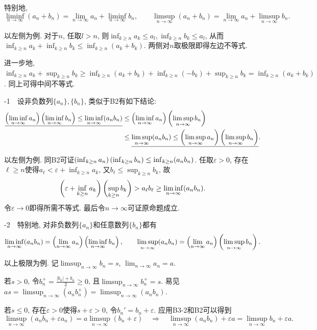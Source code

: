 特别地, $$\liminf_{n\to \infty} (a_n+b_n)  = \lim_{n\to \infty} a_n + \liminf_{n\to \infty} b_n , \qquad \limsup_{n\to \infty} (a_n+b_n)  = \lim_{n\to \infty} a_n + \limsup_{n\to \infty} b_n. $$

\begin{exsolution}
	以左侧为例. 对于$n$, 任取$l >n$, 则$\inf_{k \geq n}a_k \leq a_l, \inf_{k \geq n}b_k \leq a_l$, 从而$\inf_{k \geq n}a_k + \inf_{k \geq n}b_k \leq \inf_{k \geq n}(a_k+b_k)$. 两侧对$n$取极限即得左边不等式. 
	
	进一步地, $\inf_{k \geq n}a_k + \sup_{k \geq n}b_k \geq \inf_{k \geq n}(a_k+b_k) + \inf_{k \geq n}(-b_k) + \sup_{k \geq n}b_k = \inf_{k \geq n}(a_k+b_k)$. 同上可得中间不等式. 
\end{exsolution}

-1~~设非负数列$\{ a_n \}, \{ b_n \}$, 类似于B2有如下结论: 
\begin{align*}
	\underline{\left( \liminf_{n\to \infty} a_n \right)\left(  \liminf_{n\to \infty} b_n \right) \leq \liminf_{n\to \infty} (a_nb_n) } &\leq \left( \liminf_{n\to \infty} a_n \right)\left(  \limsup_{n\to \infty} b_n \right) \\
	&\leq \underline{\limsup_{n\to \infty} (a_nb_n) \leq \left( \limsup_{n\to \infty} a_n \right)\left(  \limsup_{n\to \infty} b_n \right)}.
\end{align*}

\begin{exsolution}
	以左侧为例. 同B2可证$\left( \inf_{k\geq n}a_n \right) \left( \inf_{k\geq n}b_n \right) \leq \inf_{k\geq n}(a_nb_n)$. 任取$\varepsilon >0$, 存在$\ell \geq n$使得$a_{\ell} < \varepsilon + \inf_{k\geq n} a_k$, 又$b_{\ell} \leq \sup_{k\geq n}b_k$, 故$$\left( \varepsilon + \inf_{k\geq n} a_k \right) \left( \sup_{k\geq n}b_k \right) >a_{\ell}b_{\ell} \geq \liminf_{n\to \infty} (a_nb_n). $$
	令$\varepsilon \to 0$即得所需不等式. 最后令$n\to \infty$可证原命题成立. 
\end{exsolution}

-2~~特别地, 对非负数列$\{ a_n \}$和任意数列$\{ b_n \}$都有$$\liminf_{n\to \infty} (a_nb_n) = \left( \lim_{n\to \infty} a_n \right) \left( \liminf_{n\to \infty} b_n \right), \qquad \limsup_{n\to \infty} (a_nb_n) = \left( \lim_{n\to \infty} a_n \right) \left( \limsup_{n\to \infty} b_n \right).$$

\begin{exsolution}
	以上极限为例. 记$\limsup_{n\to \infty} b_n=s$, $\lim_{n\to \infty} a_n =a$. 
	
	若$s>0$, 令$b_n^+=\frac{|b_n|+b_n}{2} \geq 0$, 且$\limsup_{n\to \infty} b_n^+ = s$. 易见$as = \limsup_{n\to \infty}(a_nb_n^+) = \limsup_{n\to \infty}(a_nb_n)$. 
	
	若$s \leq 0$, 存在$\varepsilon >0$使得$s + \varepsilon >0$, 令$b_n' = b_n+\varepsilon$. 应用B3-2和B2可以得到$$\limsup_{n\to \infty}(a_nb_n+\varepsilon a_n) = a\limsup_{n\to \infty} (b_n+\varepsilon) \quad \Rightarrow \quad  \limsup_{n\to \infty} (a_nb_n) + \varepsilon a = \limsup_{n\to \infty} b_n + \varepsilon a. $$
\end{exsolution}

